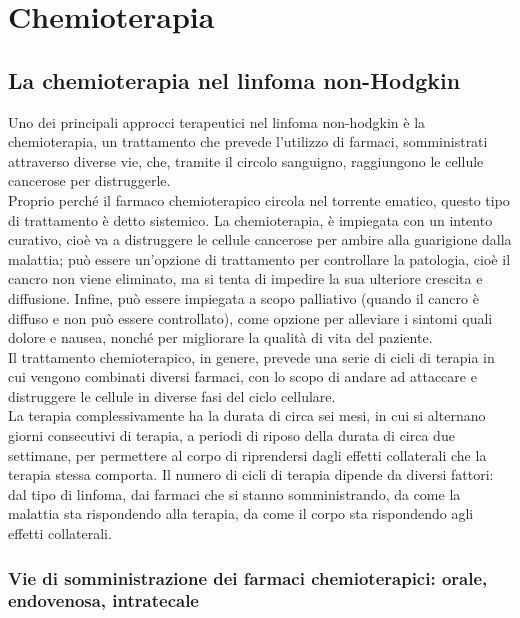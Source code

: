 \chapter{Chemioterapia}

\section{La chemioterapia nel linfoma non-Hodgkin}

Uno dei principali approcci terapeutici nel linfoma non-hodgkin è la chemioterapia, un trattamento che prevede 
l’utilizzo di farmaci, somministrati attraverso diverse vie, che, tramite il circolo sanguigno, raggiungono 
le cellule cancerose per distruggerle\cite{CHEMOUK}.\\
Proprio perché il farmaco chemioterapico circola nel torrente ematico, questo tipo di trattamento è detto sistemico. 
La chemioterapia, è impiegata con un intento curativo, cioè va a distruggere le cellule cancerose per ambire alla 
guarigione dalla malattia; può essere un’opzione di trattamento per controllare la patologia, cioè il cancro non 
viene eliminato, ma si tenta di impedire la sua ulteriore crescita e diffusione. Infine, può essere impiegata a scopo 
palliativo (quando il cancro è diffuso e non può essere controllato), come opzione per alleviare 
i sintomi quali dolore e nausea, nonché per migliorare la qualità di vita del paziente\cite{CHEMOAMERICAN}.\\
Il trattamento chemioterapico, in genere, prevede una serie di cicli di terapia in cui vengono combinati diversi 
farmaci, con lo scopo di andare ad attaccare e distruggere le cellule in diverse fasi del ciclo cellulare\cite{LYMPHACTION}.\\
La terapia complessivamente ha la durata di circa sei mesi, in cui si alternano giorni consecutivi di terapia, 
a periodi di riposo della durata di circa due settimane, per permettere al corpo di riprendersi dagli effetti 
collaterali che la terapia stessa comporta. Il numero di cicli di terapia dipende da diversi fattori: dal tipo di 
linfoma, dai farmaci che si stanno somministrando, da come la malattia sta rispondendo alla terapia, 
da come il corpo sta rispondendo agli effetti collaterali\cite{CHEMOUK}.\\

\subsection{Vie di somministrazione dei farmaci chemioterapici: orale, endovenosa, intratecale}


